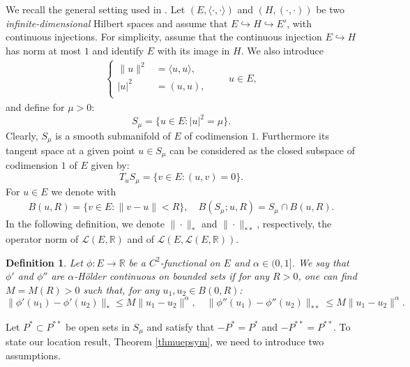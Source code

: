 \documentclass[10pt,a4paper]{article}
\newtheorem{definition}[theorem]{Definition}
\theoremstyle{definition} \theoremstyle{remark}
\numberwithin{equation}{section}
\newcommand{\R}{\mathbb{R}}
\begin{document}
\vskip0.1in

We recall the general setting used in \cite{BCJN}. Let $\left(E,\langle \cdot, \cdot \rangle\right)$ and $\left(H,(\cdot,\cdot)\right)$ be two \emph{infinite-dimensional} Hilbert spaces and assume that $E\hookrightarrow H \hookrightarrow E'$,
with continuous injections.  For simplicity, assume that the
continuous injection $E\hookrightarrow H$ has norm at most $1$ and
identify $E$ with its image in $H$. We also introduce
\begin{align*}
	\left\{
	\begin{aligned}
		\|u\|^2 & = \langle u,u \rangle, \\
		|u|^2 \ & = (u,u), \\
	\end{aligned}
	\right.
	\quad \quad u \in E,
\end{align*}
and define for $\mu>0$:
\begin{equation*}
	S_\mu = \bigl\{ u \in E: |u|^2=\mu \bigr\}.
\end{equation*}
Clearly, $S_{\mu}$ is a smooth submanifold of $E$ of codimension
$1$. Furthermore its tangent space at a given point $u \in S_{\mu}$
can be considered as the closed subspace of codimension $1$ of $E$
given by:
\begin{equation*}
	T_u S_{\mu} = \bigl\{v \in E : (u,v) =0 \bigr\}.
\end{equation*}
For $u \in E$ we denote with
\begin{align*}
	B(u,R) = \bigl\{v \in E: \|v - u\| < R\bigr\}, \quad B(S_\mu;u,R) = S_\mu \cap B(u,R).
\end{align*}
In the following definition, we denote  $\|\cdot\|_*$ and
$\|\cdot\|_{**}$, respectively, the operator norm of $\mathscr{L}(E,\R)$ and of
$\mathscr{L}(E,\mathscr{L}(E,\R))$.

\begin{definition}\label{Holder-continuous}
	Let $\phi : E \rightarrow \mathbb{R}$ be a $C^2$-functional on $E$
	and $\alpha \in (0,1]$. We say that $\phi'$ and $\phi''$
	are \emph{$\alpha$-H\"older continuous on bounded sets} if for any
	$R>0$, one can find $M=M(R)>0$ such that, for any
	$u_1,u_2\in B(0,R)$:
	\begin{equation} \label{eqalpha}
		\|\phi'(u_1)-\phi'(u_2)\|_* \leq M \|u_1-u_2\|^{\alpha}, \quad
		\|\phi''(u_1)-\phi''(u_2)\|_{**} \leq M\|u_1-u_2\|^\alpha.
	\end{equation}
\end{definition}

Let $P^* \subset P^{**}$ be open sets in $S_\mu$ and satisfy that $-P^{*} = P^*$ and $-P^{**} = P^{**}$. To state our location result, Theorem \ref{thmuepsym}, we need to introduce two assumptions.
\end{document}

